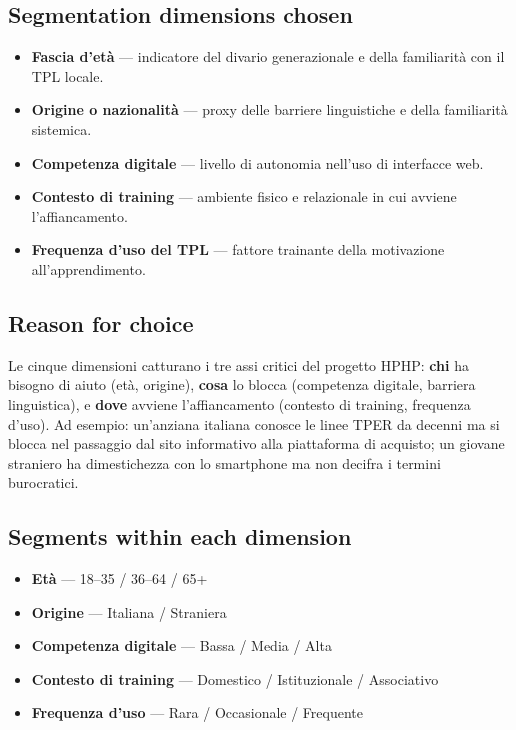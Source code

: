 \documentclass[11pt,a4paper]{article}
\begin{document}
\subsection{Segmentation dimensions chosen}

\begin{tcolorbox}[colback=backgroundColor,colframe=borderColor,arc=2mm]
\begin{itemize}[leftmargin=*,itemsep=4pt]
    \item \textbf{Fascia d'età} --- indicatore del divario generazionale
    e della familiarità con il TPL locale.
    \item \textbf{Origine o nazionalità} --- proxy delle barriere
    linguistiche e della familiarità sistemica.
    \item \textbf{Competenza digitale} --- livello di autonomia
    nell'uso di interfacce web.
    \item \textbf{Contesto di training} --- ambiente fisico e
    relazionale in cui avviene l'affiancamento.
    \item \textbf{Frequenza d'uso del TPL} --- fattore trainante
    della motivazione all'apprendimento.
\end{itemize}
\end{tcolorbox}

\vspace{0.4cm}

\subsection{Reason for choice}

Le cinque dimensioni catturano i tre assi critici del progetto HPHP:
\textbf{chi} ha bisogno di aiuto (età, origine), \textbf{cosa} lo blocca
(competenza digitale, barriera linguistica), e \textbf{dove} avviene
l'affiancamento (contesto di training, frequenza d'uso). Ad esempio:
un'anziana italiana conosce le linee TPER da decenni ma si blocca nel
passaggio dal sito informativo alla piattaforma di acquisto; un giovane
straniero ha dimestichezza con lo smartphone ma non decifra i termini
burocratici.

\vspace{0.4cm}

\begin{tcolorbox}[colback=backgroundColor,colframe=borderColor,arc=2mm]
\subsection{Segments within each dimension}
\begin{itemize}[leftmargin=*,itemsep=4pt]
\item \textbf{Età} --- 18--35 / 36--64 / 65+
\item \textbf{Origine} --- Italiana / Straniera
\item \textbf{Competenza digitale} --- Bassa / Media / Alta
\item \textbf{Contesto di training} --- Domestico / Istituzionale /
Associativo
\item \textbf{Frequenza d'uso} --- Rara / Occasionale / Frequente
\end{itemize}
\end{tcolorbox}
\end{document}
